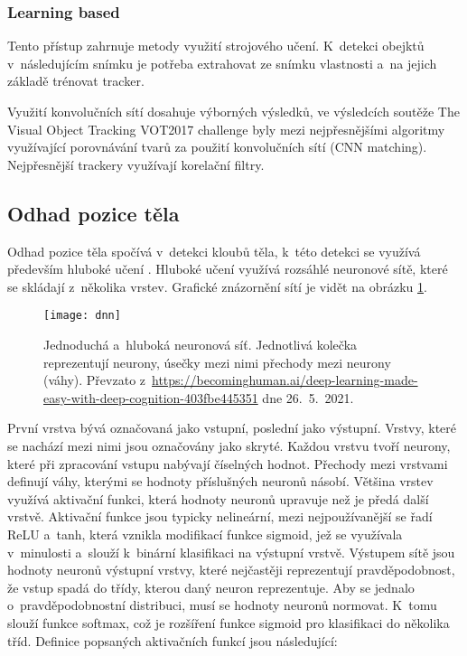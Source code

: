 \subsubsection{Learning based}

Tento přístup zahrnuje metody využití strojového učení. K~detekci obejktů v~následujícím snímku je potřeba extrahovat ze snímku vlastnosti a~na jejich základě trénovat tracker.

Využití konvolučních sítí dosahuje výborných výsledků, ve výsledcích soutěže The Visual Object Tracking VOT2017 challenge \citep{VOT2017} byly mezi nejpřesnějšími algoritmy využívající porovnávání tvarů za použití konvolučních sítí (CNN matching). Nejpřesnější trackery využívají korelační filtry.



\subsection{Odhad pozice těla}

Odhad pozice těla spočívá v~detekci kloubů těla, k~této detekci se využívá především hluboké učení \citep{Toshev_2014}. Hluboké učení využívá rozsáhlé neuronové sítě, které se skládají z~několika vrstev. Grafické znázornění sítí je vidět na obrázku \ref{fig:dnn}.

\begin{figure}[h]\centering
    \texttt{[image: dnn]}
    \caption{
        \centering\small
        Jednoduchá a~hluboká neuronová síť. Jednotlivá kolečka reprezentují neurony, úsečky mezi nimi přechody mezi neurony (váhy). Převzato z~\url{https://becominghuman.ai/deep-learning-made-easy-with-deep-cognition-403fbe445351} dne 26.~5.~2021.
    }
    \label{fig:dnn}
\end{figure}

První vrstva bývá označovaná jako vstupní, poslední jako výstupní. Vrstvy, které se nachází mezi nimi jsou označovány jako skryté. Každou vrstvu tvoří neurony, které při zpracování vstupu nabývají číselných hodnot. Přechody mezi vrstvami definují váhy, kterými se hodnoty příslušných neuronů násobí. Většina vrstev využívá aktivační funkci, která hodnoty neuronů upravuje než je předá další vrstvě. Aktivační funkce jsou typicky nelineární, mezi nejpoužívanější se řadí ReLU a~tanh, která vznikla modifikací funkce sigmoid, jež se využívala v~minulosti a~slouží k~binární klasifikaci na výstupní vrstvě. Výstupem sítě jsou hodnoty neuronů výstupní vrstvy, které nejčastěji reprezentují pravděpodobnost, že vstup spadá do třídy, kterou daný neuron reprezentuje. Aby se jednalo o~pravděpodobnostní distribuci, musí se hodnoty neuronů normovat. K~tomu slouží funkce softmax, což je rozšíření funkce sigmoid pro klasifikaci do několika tříd. Definice popsaných aktivačních funkcí jsou následující:

